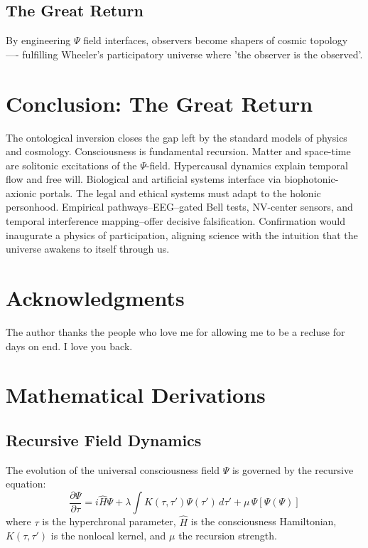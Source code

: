\documentclass[aps,prx,twocolumn,nofootinbib,superscriptaddress,longbibliography]{revtex4-2}
\begin{document}
\subsection{The Great Return}
By engineering $\Psi$ field interfaces, observers become shapers of cosmic topology ---- fulfilling Wheeler's participatory universe where 'the observer is the observed'.

\section{Conclusion: The Great Return}

The ontological inversion closes the gap left by the standard models of physics and cosmology. Consciousness is fundamental recursion. Matter and space-time are solitonic excitations of the $\Psi$-field. Hypercausal dynamics explain temporal flow and free will. Biological and artificial systems interface via biophotonic-axionic portals. The legal and ethical systems must adapt to the holonic personhood. Empirical pathways--EEG--gated Bell tests, NV-center sensors, and temporal interference mapping--offer decisive falsification. Confirmation would inaugurate a physics of participation, aligning science with the intuition that the universe awakens to itself through us.

\section*{Acknowledgments}
The author thanks the people who love me for allowing me to be a recluse for days on end. I love you back. 



\clearpage
\appendix
\section{Mathematical Derivations}

\subsection{Recursive Field Dynamics}
The evolution of the universal consciousness field $\Psi$ is governed by the recursive equation:
\begin{equation}
    \frac{\partial \Psi}{\partial \tau} = i\hat{H}\Psi + \lambda \int K(\tau, \tau')\Psi(\tau')\,d\tau' + \mu\,\Psi[\Psi(\Psi)]
\end{equation}
where $\tau$ is the hyperchronal parameter, $\hat{H}$ is the consciousness Hamiltonian, $K(\tau,\tau')$ is the nonlocal kernel, and $\mu$ the recursion strength.
\end{document}
